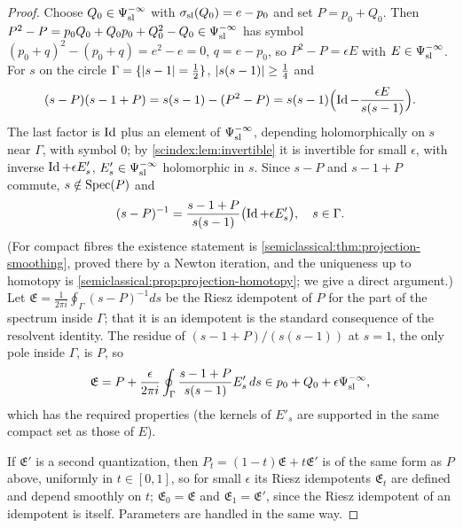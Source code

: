 \begin{proof}
  Choose $Q_0\in\Psi^{-\infty}_{\mathrm{sl}}$ with $\sigma_{\mathrm{sl}}(Q_0)=e-p_0$ and set $P=p_0+Q_0$. Then
  $P^2-P=p_0Q_0+Q_0p_0+Q_0^2-Q_0\in\Psi^{-\infty}_{\mathrm{sl}}$ has symbol
  $(p_0+q)^2-(p_0+q)=e^2-e=0$, $q=e-p_0$, so $P^2-P=\epsilon E$ with
  $E\in\Psi^{-\infty}_{\mathrm{sl}}$. For $s$ on the circle $\Gamma=\{\lvert s-1\rvert=\frac12\}$,
  $\lvert s(s-1)\rvert\ge\frac14$ and
  \begin{equation*}
    (s-P)(s-1+P)=s(s-1)-(P^2-P)=s(s-1)\Bigl(\operatorname{Id}-\frac{\epsilon E}{s(s-1)}\Bigr).
  \end{equation*}
  The last factor is $\operatorname{Id}$ plus an element of $\Psi^{-\infty}_{\mathrm{sl}}$, depending
  holomorphically on $s$ near $\Gamma$, with symbol $0$; by
  \cref{scindex:lem:invertible} it is invertible for small $\epsilon$, with
  inverse $\operatorname{Id}+\epsilon E'_s$, $E'_s\in\Psi^{-\infty}_{\mathrm{sl}}$ holomorphic in $s$. Since
  $s-P$ and $s-1+P$ commute, $s\notin\operatorname{Spec}(P)$ and
  \begin{equation*}
    (s-P)^{-1}=\frac{s-1+P}{s(s-1)}\bigl(\operatorname{Id}+\epsilon E'_s\bigr),\quad s\in\Gamma.
  \end{equation*}
  (For compact fibres the existence statement is
  \cref{semiclassical:thm:projection-smoothing}, proved there by a Newton
  iteration, and the uniqueness up to homotopy is
  \cref{semiclassical:prop:projection-homotopy}; we give a direct argument.)
  Let $\mathfrak E=\frac1{2\pi i}\oint_\Gamma(s-P)^{-1}ds$ be the Riesz idempotent
  of $P$ for the part of the spectrum inside $\Gamma$; that it is an idempotent is
  the standard consequence of the resolvent identity. The residue of
  $(s-1+P)/(s(s-1))$ at $s=1$, the only pole inside $\Gamma$, is $P$, so
  \begin{equation*}
    \mathfrak E=P+\frac{\epsilon}{2\pi i}\oint_\Gamma\frac{s-1+P}{s(s-1)}
    E'_s\,ds\in p_0+Q_0+\epsilon\Psi^{-\infty}_{\mathrm{sl}},
  \end{equation*}
  which has the required properties (the kernels of $E'_s$ are supported in the
  same compact set as those of $E$).

  If $\mathfrak E'$ is a second quantization, then $P_t=(1-t)\mathfrak E+t
  \mathfrak E'$ is of the same form as $P$ above, uniformly in $t\in[0,1]$, so
  for small $\epsilon$ its Riesz idempotents $\mathfrak E_t$ are defined and
  depend smoothly on $t$; $\mathfrak E_0=\mathfrak E$ and $\mathfrak E_1=
  \mathfrak E'$, since the Riesz idempotent of an idempotent is itself. Parameters
  are handled in the same way.
\end{proof}

